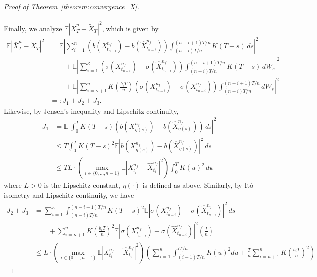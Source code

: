 \documentclass[11pt]{article}%
\theoremstyle{definition}
\begin{document}
\begin{proof}[Proof of Theorem~\ref{theorem:convergence_X}]
    \paragraph{} Finally, we analyze \(\mathbb{E}|\bar{X}_T^n - \widetilde{X}_T|^2\), which is given by
    \begin{align}
        \mathbb{E}|\bar{X}_T^n - \widetilde{X}_T|^2 &= \mathbb{E} \left|\sum_{i=1}^{n} (b(X_{t_{n-i}}^{n_f}) - b(\widehat{X}_{t_{n-i}}^{n_f})) \int_{(n-i)T/n}^{(n-i+1)T/n} K(T-s)\,ds\right|^2\nonumber\\
        &\qquad + \mathbb{E} \left|\sum_{i=1}^{\kappa} (\sigma(X_{t_{n-i}}^{n_f}) - \sigma(\widehat{X}_{t_{n-i}}^{n_f}))\int_{(n-i)T/n}^{(n-i+1)T/n} K(T-s)\,dW_s\right|^2\nonumber\\
        &\qquad + \mathbb{E} \left|\sum_{i=\kappa+1}^{n} K\left(\frac{b_i T}{n}\right) (\sigma(X_{t_{n-i}}^{n_f}) - \sigma(X_{t_{n-i}}^{n_f})) \int_{(n-i)T/n}^{(n-i+1)T/n} dW_s\right|^2\nonumber\\
        &=: J_1 + J_2 + J_3.
    \end{align}
    Likewise, by Jensen's inequality and Lipschitz continuity, 
    \begin{align}
        J_1 &= \mathbb{E}\left|\int_0^T K(T-s) (b(X_{\eta(s)}^{n_f}) - b(\widehat{X}_{\eta(s)}^{n_f}))\,ds\right|^2\nonumber\\
        &\le T \int_0^T K(T-s)^2 \mathbb{E} |b(X_{\eta(s)}^{n_f}) - b(\widehat{X}_{\eta(s)}^{n_f})|^2\,ds\nonumber\\
        &\le T L \cdot \left(\max_{i\in\{0,...,n-1\}} \mathbb{E} |X_{t_i}^{n_f} - \widehat{X}_{t_i}^{n_f}|^2\right) \int_0^T K(u)^2\,du\label{eq:barXn_tildeX_1}
    \end{align}
    where \(L>0\) is the Lipschitz constant, \(\eta(\cdot)\) is defined as above. Similarly, by It\^o isometry and Lipschitz continuity, we have
    \begin{align}
        J_2 + J_3 &= \sum_{i=1}^{\kappa} \int_{(n-i)T/n}^{(n-i+1)T/n} K(T-s)^2 \mathbb{E} |\sigma(X_{t_{n-i}}^{n_f}) - \sigma(\widehat{X}_{t_{n-i}}^{n_f})|^2\,ds \nonumber\\
        &\qquad + \sum_{i=\kappa+1}^{n} K\left(\frac{b_i T}{n}\right)^2 \mathbb{E} |\sigma(X_{t_{n-i}}^{n_f}) - \sigma(\widehat{X}_{t_{n-i}}^{n_f})|^2 \left(\frac{T}{n}\right)\nonumber\\
        &\le L\cdot \left(\max_{i\in\{0,...,n-1\}} \mathbb{E} |X_{t_i}^{n_f} - \widehat{X}_{t_i}^{n_f}|^2\right) \left(\sum_{i=1}^{\kappa} \int_{(i-1)T/n}^{iT/n} K(u)^2 du + \frac{T}{n} \sum_{i=\kappa+1}^{n} K\left(\frac{b_i T}{n}\right)^2\right)\label{eq:barXn_tildeX_2}

\end{align}
\end{proof}
\end{document}
